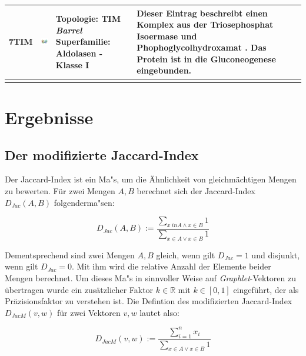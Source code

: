 \documentclass{report}
\begin{document}
\begin{table}
\begin{center}
\begin{tabular}{ | C{9mm} | C{30mm} | C{29mm} | C{38mm} | }
7TIM  & \includegraphics[width=30mm, trim= -10 -5 -5 -10]{7TIM_bio_r_500.jpg} & Topologie: \newline TIM \textit{Barrel} \newline Superfamilie: Aldolasen - Klasse I & Dieser Eintrag beschreibt einen Komplex aus der Triosephosphat Isoermase und Phophoglycolhydroxamat \cite{7tim}. Das Protein ist in die Gluconeogenese eingebunden.\\ 
\hline

\label{tab:aldolasen2}
\end{tabular}
\end{center}
\end{table}



\chapter{Ergebnisse}

\section{Der modifizierte Jaccard-Index}


Der Jaccard-Index ist ein Ma"s, um die \"Ahnlichkeit von gleichm\"achtigen Mengen zu bewerten. F\"ur zwei Mengen $A,B$ berechnet sich der Jaccard-Index $D_{Jac}(A,B)$ folgenderma"sen:

\[ D_{Jac}(A,B) := \frac{\sum_{x \ in A \land x \in B} 1}{\sum_{x \in A \lor x \in B} 1} \]

Dementsprechend sind zwei Mengen $A,B$ gleich, wenn  gilt $D_{Jac} = 1$ und disjunkt, wenn gilt $D_{Jac} = 0$. Mit ihm wird die relative Anzahl der Elemente beider Mengen berechnet.
Um dieses Ma"s in sinnvoller Weise auf \textit{Graphlet}-Vektoren zu \"ubertragen wurde ein zus\"atzlicher Faktor $k \in \mathbb{R} $ mit $k \in [0,1]$  eingef\"uhrt, der als Pr\"azisionsfaktor zu verstehen ist. Die Defintion des modifizierten Jaccard-Index $D_{JacM}(v,w)$ f\"ur zwei Vektoren $v,w$ lautet also:

\[ D_{JacM}(v,w) := \frac{\sum_{i = 1}^n x_i}{\sum_{x \in A \lor x \in B} 1} \]
\end{document}
